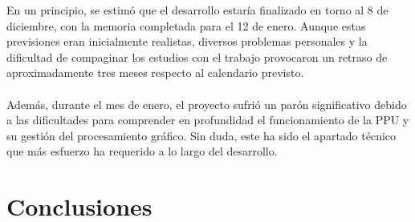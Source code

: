En un principio, se estimó que el desarrollo estaría finalizado en torno al 8 de diciembre, con la memoria completada para el 12 de enero. Aunque estas previsiones eran inicialmente realistas, diversos problemas personales y la dificultad de compaginar los estudios con el trabajo provocaron un retraso de aproximadamente tres meses respecto al calendario previsto.
\\\\
Además, durante el mes de enero, el proyecto sufrió un parón significativo debido a las dificultades para comprender en profundidad el funcionamiento de la PPU y su gestión del procesamiento gráfico. Sin duda, este ha sido el apartado técnico que más esfuerzo ha requerido a lo largo del desarrollo.

\cleardoublepage
\chapter{Conclusiones}
\label{conclusiones}

